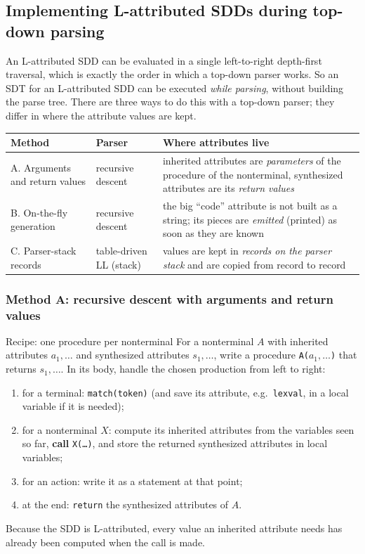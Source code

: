 \documentclass[11pt,a4paper]{article}
\begin{document}
\subsection{Implementing L-attributed SDDs during top-down parsing}
\label{sec:impl-lattr}

An L-attributed SDD can be evaluated in a single left-to-right depth-first traversal, which is exactly the order in which a top-down parser works. So an SDT for an L-attributed SDD can be executed \emph{while parsing}, without building the parse tree. There are three ways to do this with a top-down parser; they differ in where the attribute values are kept.

\begin{center}
\small
\begin{tabular}{@{}l p{4.2cm} p{6.4cm}@{}}
\toprule
\textbf{Method} & \textbf{Parser} & \textbf{Where attributes live} \\ \midrule
A. Arguments and return values & recursive descent & inherited attributes are \emph{parameters} of the procedure of the nonterminal, synthesized attributes are its \emph{return values} \\
B. On-the-fly generation & recursive descent & the big ``code'' attribute is not built as a string; its pieces are \emph{emitted} (printed) as soon as they are known \\
C. Parser-stack records & table-driven LL (stack) & values are kept in \emph{records on the parser stack} and are copied from record to record \\ \bottomrule
\end{tabular}
\end{center}

\subsubsection{Method A: recursive descent with arguments and return values}

\begin{defbox}{Recipe: one procedure per nonterminal}
For a nonterminal $A$ with inherited attributes $a_1,\dots$ and synthesized attributes $s_1,\dots$, write a procedure \texttt{A($a_1,\dots$)} that returns $s_1,\dots$. In its body, handle the chosen production from left to right:
\begin{enumerate}[nosep]
\item for a terminal: \texttt{match(token)} (and save its attribute, e.g.\ \texttt{lexval}, in a local variable if it is needed);
\item for a nonterminal $X$: compute its inherited attributes from the variables seen so far, \textbf{call} \texttt{X(\dots)}, and store the returned synthesized attributes in local variables;
\item for an action: write it as a statement at that point;
\item at the end: \texttt{return} the synthesized attributes of $A$.
\end{enumerate}
Because the SDD is L-attributed, every value an inherited attribute needs has already been computed when the call is made.
\end{defbox}
\end{document}
